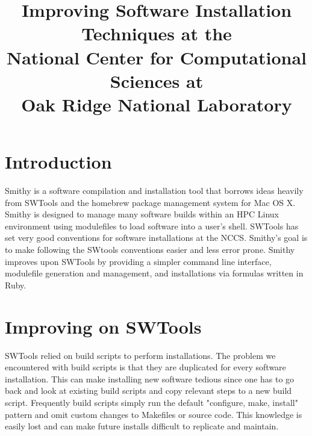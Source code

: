 \documentclass[conference]{IEEEtran}
\begin{document}
\title{Improving Software Installation Techniques at the\\
National Center for Computational Sciences at\\
Oak Ridge National Laboratory}

\author{
\and
{}
}
\maketitle

\IEEEpeerreviewmaketitle


\section{Introduction}

Smithy is a software compilation and installation tool that borrows ideas
heavily from SWTools\cite{swtools} and the homebrew\cite{homebrew} package
management system for Mac OS X.  Smithy is designed to manage many software
builds within an HPC Linux environment using modulefiles to load software into a
user's shell.  SWTools has set very good conventions for software installations
at the NCCS.  Smithy's goal is to make following the SWtools conventions easier
and less error prone.  Smithy improves upon SWTools by providing a simpler
command line interface, modulefile generation and management, and installations
via formulas written in Ruby.

\section{Improving on SWTools}

SWTools relied on build scripts to perform installations.  The problem we
encountered with build scripts is that they are duplicated for every software
installation.  This can make installing new software tedious since one has to go
back and look at existing build scripts and copy relevant steps to a new build
script.  Frequently build scripts simply run the default "configure, make, install"
pattern and omit custom changes to Makefiles or source code. This knowledge is
easily lost and can make future installs difficult to replicate and maintain.
\end{document}
